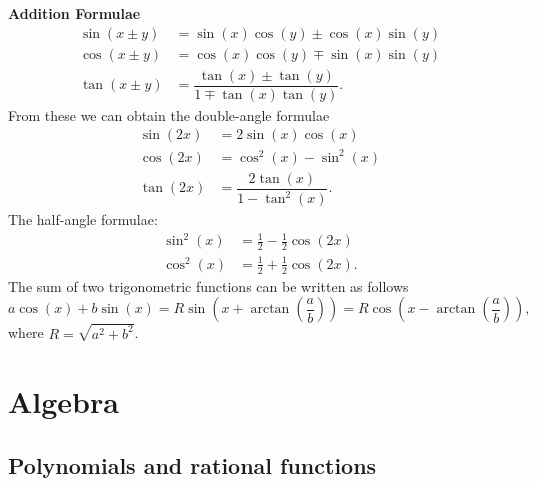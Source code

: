 \documentclass[10pt, a4paper]{article}
\begin{document}
\textbf{Addition Formulae} \\
\begin{align*}
    \sin(x \pm y) &= \sin(x)\cos(y) \pm \cos(x)\sin(y) \\
    \cos(x \pm y) &= \cos(x)\cos(y) \mp \sin(x)\sin(y) \\
    \tan(x \pm y) &= \dfrac{\tan(x) \pm \tan(y)}{1 \mp \tan(x)\tan(y)}.
\end{align*}
From these we can obtain the double-angle formulae
\begin{align*}
    \sin(2x) &= 2\sin(x)\cos(x) \\
    \cos(2x) &= \cos^2(x) - \sin^2(x) \\
    \tan(2x) &= \dfrac{2\tan(x)}{1 - \tan^2(x)}.
\end{align*}
The half-angle formulae:
\begin{align*}
    \sin^2(x) &= \frac{1}{2} - \frac{1}{2}\cos(2x) \\
    \cos^2(x) &= \frac{1}{2} + \frac{1}{2}\cos(2x).
\end{align*}
The sum of two trigonometric functions can be written as follows \\
\[
a\cos(x) + b\sin(x) = R\sin\left(x + \arctan\left(\frac{a}{b}\right)\right) = R\cos\left(x - \arctan\left(\frac{a}{b}\right)\right),
\]
where $R = \sqrt{a ^ 2 + b ^ 2}$.

\newpage

\section{Algebra}

\subsection{Polynomials and rational functions}
\end{document}
